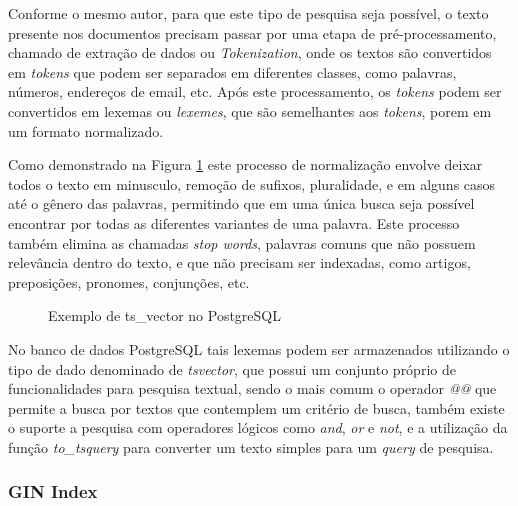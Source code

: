 Conforme o mesmo autor, para que este tipo de pesquisa seja possível, o texto presente nos documentos precisam
passar por uma etapa de pré-processamento, chamado de extração de dados ou \emph{Tokenization},
onde os textos são convertidos em \emph{tokens} que podem ser separados em diferentes classes,
como palavras, números, endereços de email, etc. Após este processamento, os \emph{tokens}
podem ser convertidos em lexemas ou \emph{lexemes}, que são semelhantes aos \emph{tokens},
porem em um formato normalizado.

Como demonstrado na Figura \ref{fig:ts-vector-exemple} este processo de normalização envolve
deixar todos o texto em minusculo, remoção de sufixos, pluralidade, e em alguns casos até o
gênero das palavras, permitindo que em uma única busca seja possível encontrar por todas as
diferentes variantes de uma palavra. Este processo também elimina as chamadas \emph{stop words},
palavras comuns que não possuem relevância dentro do texto, e que não precisam ser indexadas,
como artigos, preposições, pronomes, conjunções, etc.

\begin{figure}[H]
    \caption{Exemplo de ts\_vector no PostgreSQL}
    \centering
    \label{fig:ts-vector-exemple}
\end{figure}

No banco de dados PostgreSQL tais lexemas podem ser armazenados utilizando o tipo de
dado denominado de \emph{tsvector}, que possui um conjunto próprio de funcionalidades
para pesquisa textual, sendo o mais comum o operador \emph{@@} que permite a busca por textos
que contemplem um critério de busca, também existe o suporte a pesquisa com operadores lógicos
como \emph{and}, \emph{or} e \emph{not}, e a utilização da função \emph{to\_tsquery} para
converter um texto simples para um \emph{query} de pesquisa.

\subsubsection{GIN Index}

